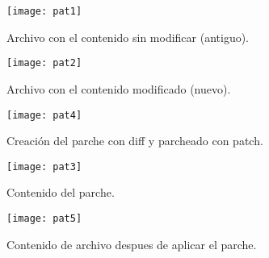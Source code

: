 \documentclass[a4paper, 11pt]{article} %
\begin{document}
\begin{figure}[h]
\centering 
\texttt{[image: pat1]} 
\caption{Archivo con el contenido sin modificar (antiguo).} 
\vspace{-0.5cm}
\label{contexto:figura} 
\end{figure}
\begin{figure}[h]
\centering 
\texttt{[image: pat2]} 
\caption{Archivo con el contenido modificado (nuevo).} 
\vspace{-0.5cm}
\label{contexto:figura} 
\end{figure}
\begin{figure}[h]
\centering 
\texttt{[image: pat4]} 
\caption{Creación del parche con diff y parcheado con patch.} 
\vspace{-0.5cm}
\label{contexto:figura} 
\end{figure}
\begin{figure}[h]
\centering 
\texttt{[image: pat3]} 
\caption{Contenido del parche.} 
\vspace{-0.5cm}
\label{contexto:figura} 
\end{figure}
\begin{figure}[h]
\centering 
\texttt{[image: pat5]} 
\caption{Contenido de archivo despues de aplicar el parche.} 
\vspace{-0.5cm}
\label{contexto:figura} 
\end{figure}
\end{document}
